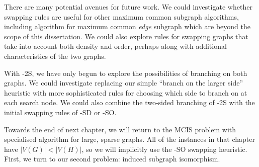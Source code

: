 There are many potential avenues for future work.  We could investigate
whether swapping rules are useful for other maximum common subgraph algorithms, including
algorithm for maximum common \emph{edge} subgraph which are beyond the scope of this
dissertation.
We could also explore rules for swapping graphs that take into account both density and order,
perhaps along with additional characteristics of the two graphs.

With \McSplit-2S, we have only begun to explore the possibilities of branching on both graphs.
We could investigate replacing our simple ``branch on the larger side'' heuristic with more
sophisticated rules for choosing which side to branch on at each search node.  We could also
combine the two-sided branching of \McSplit-2S with the initial swapping rules of \McSplit-SD
or \McSplit-SO.

Towards the end of next chapter, we will return to the MCIS problem with
specialised algorithm for large, sparse graphs.  All of the instances in that
chapter have $|V(G)| < |V(H)|$, so we will implicitly use the \McSplit-SO
swapping heuristic. First, we turn to our second problem: induced subgraph
isomorphism.
